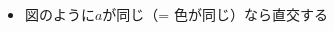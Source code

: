 \begin{frame}
  \begin{columns}
    \begin{column}{0.1\textwidth}
    \end{column}
    \begin{column}{0.9\textwidth}
      \begin{itemize}
        \item<+-> 図のように$a$が同じ（= 色が同じ）なら直交する
       

\end{itemize}
\end{column}
\end{columns}
\end{frame}
